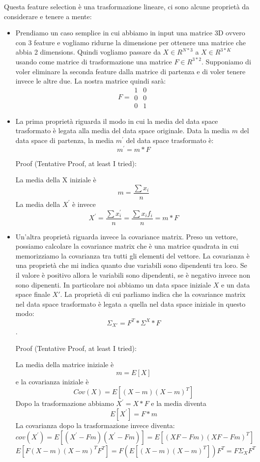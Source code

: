 \documentclass[14pt]{extreport}
\begin{document}
Questa feature selection è una trasformazione lineare, ci sono alcune proprietà da considerare e tenere a mente:

\begin{itemize}
\item Prendiamo un caso semplice in cui abbiamo in input una matrice 3D ovvero con 3 feature e vogliamo ridurne la dimensione
per ottenere una matrice che abbia 2 dimensions. Quindi vogliamo passare da $X \in R^{N*3}$ a $X \in R^{3*K}$ usando come matrice di
trasformazione una matrice $F \in R^{3*2}$.
Supponiamo di voler eliminare la seconda feature dalla matrice di partenza e di voler tenere invece le altre due.
La nostra matrice quindi sarà:
\begin{equation}
F = \begin{matrix}
1 & 0\\
0 & 0\\
0 & 1
\end{matrix}
\end{equation}
\item La prima proprietà riguarda il modo in cui la media del data space trasformato è legata alla media del data space originale.
Data la media $m$ del data space di partenza, la media $m^{'}$ del data space trasformato è:
$$m^{'} = m * F$$

Proof (Tentative Proof, at least I tried):

La media della X iniziale è $$m = \frac{\sum x_i}{n}$$
La media della $X^{'}$ è invece $$X^{'} = \frac{\sum x_i^{'}}{n} = \frac{\sum x_i f_i}{n} = m*F$$

\item Un'altra proprietà riguarda invece la covariance matrix. Preso un vettore, possiamo calcolare la covariance matrix che è una
matrice quadrata in cui memorizziamo la covarianza tra tutti gli elementi del vettore. La covarianza è una proprietà che mi indica quanto
due variabili sono dipendenti tra loro. Se il valore è positivo allora le variabili sono dipendenti, se è negativo invece non sono dipenenti.
In particolare noi abbiamo un data space iniziale $X$ e un data space finale $X'$. La proprietà di cui parliamo indica che la covariance
matrix nel data space trasformato è legata a quella nel data space iniziale in questo modo:
$$\Sigma_{X'} = F^T*\Sigma^{X}*F$$.

Proof (Tentative Proof, at least I tried):

La media della matrice iniziale è $$m = E[X]$$ e la covarianza iniziale è $$Cov(X) = E[(X-m)(X-m)^T]$$
Dopo la trasformazione abbiamo $X^{'} = X*F$ e la media diventa $$E[X^{'}] = F*m$$
La covarianza dopo la trasformazione invece diventa: $$cov(X^{'}) = E[(X^{'}-Fm)(X^{'}-Fm)] = E[(XF-Fm)(XF-Fm)^T]$$
$$E[F(X-m)(X-m)^{T}F^{T}] = F(E[(X-m)(X-m)^{T}])F^{T} = F\Sigma_{X}F^{T}$$
\end{itemize}
\end{document}
